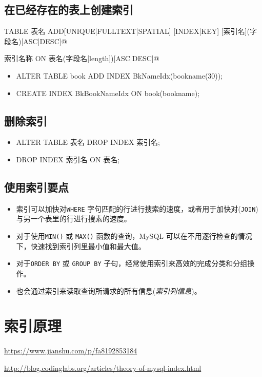 \documentclass[UTF8,a4paper,12pt]{ctexbook}
\begin{document}
		
		\subsection{在已经存在的表上创建索引}
		
			\verb@ALTER TABLE 表名 ADD[UNIQUE|FULLTEXT|SPATIAL] [INDEX|KEY] [索引名](字段名)[ASC|DESC]@
			
			 索引名称 ON 表名(字段名[length])[ASC|DESC]@
			
			\begin{itemize}
				\item ALTER TABLE book ADD INDEX BkNameIdx(bookname(30));
				\item CREATE INDEX BkBookNameIdx ON book(bookname);
			\end{itemize}
		
		\subsection{删除索引}
			\begin{itemize}
				\item ALTER TABLE 表名 DROP INDEX 索引名;
				\item DROP INDEX 索引名 ON 表名;
			\end{itemize}
		
		\subsection{使用索引要点}
			\begin{itemize}
				\item 索引可以加快对\verb|WHERE| 字句匹配的行进行搜索的速度，或者用于加快对(\verb|JOIN|)与另一个表里的行进行搜素的速度。
				\item 对于使用\verb|MIN()| 或 \verb|MAX()| 函数的查询，MySQL 可以在不用逐行检查的情况下，快速找到索引列里最小值和最大值。
				\item 对于\verb|ORDER BY| 或 \verb|GROUP BY| 子句，经常使用索引来高效的完成分类和分组操作。
				\item 也会通过索引来读取查询所请求的所有信息(\textit{索引列信息})。
			\end{itemize}
					
	
	\section{索引原理}
		\url{https://www.jianshu.com/p/fa8192853184}
	
		\url{http://blog.codinglabs.org/articles/theory-of-mysql-index.html}
	
\end{document}
